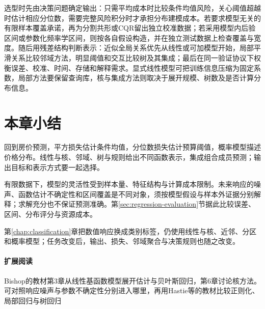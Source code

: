 选型时先由决策问题确定输出：只需平均成本时比较条件均值风险，关心阈值超越时估计相应分位数，需要完整风险积分时才承担分布建模成本。若要求模型无关的有限样本覆盖承诺，再为分割共形或CQR留出独立校准数据；若采用模型内后验区间或参数化频率学区间，则按各自假设构造，并在独立测试数据上检查覆盖与宽度。随后用残差结构判断表示：近似全局关系优先从线性或可加模型开始，局部平滑关系比较邻域方法，明显阈值和交互比较树及其集成；最后在同一验证协议下权衡误差、校准、时间、存储和解释需求。显式线性模型可把训练信息压缩为固定系数，局部方法要保留查询库，核与集成方法则取决于展开规模、树数及是否计算分布信息。

\section{本章小结}
\label{sec:regression-summary}

回到房价预测，平方损失估计条件均值，分位数损失估计预算阈值，概率模型描述价格分布。线性与核、邻域、树与规则给出不同函数表示，集成组合成员预测；输出目标和表示方式要一起选择。

有限数据下，模型的灵活性受到样本量、特征结构与计算成本限制。未来响应的噪声、函数估计不确定性和区间覆盖是不同对象，须按模型假设与样本外证据分别解释；求解充分也不保证预测准确。第\ref{sec:regression-evaluation}节据此比较误差、区间、分布评分与资源成本。

第\ref{chap:classification}章把数值响应换成类别标签，仍使用线性与核、近邻、分区和概率模型；任务改变后，输出、损失、邻域聚合与决策规则也随之改变。

\paragraph{扩展阅读}
Bishop的教材第3章从线性基函数模型展开估计与贝叶斯回归，第6章讨论核方法。可对照响应噪声与参数不确定性分别进入哪里，再用Hastie等的教材比较正则化、局部回归与树回归
